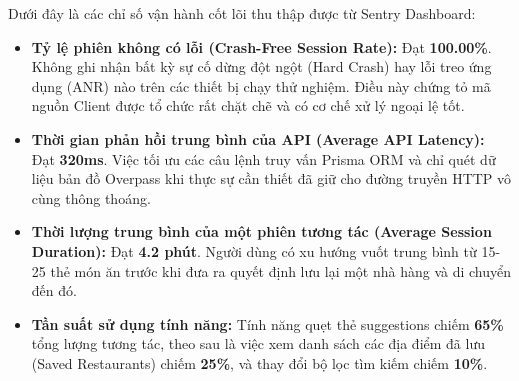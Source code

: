 Dưới đây là các chỉ số vận hành cốt lõi thu thập được từ Sentry Dashboard:
\begin{itemize}
    \item \textbf{Tỷ lệ phiên không có lỗi (Crash-Free Session Rate):} Đạt \textbf{100.00\%}. Không ghi nhận bất kỳ sự cố dừng đột ngột (Hard Crash) hay lỗi treo ứng dụng (ANR) nào trên các thiết bị chạy thử nghiệm. Điều này chứng tỏ mã nguồn Client được tổ chức rất chặt chẽ và có cơ chế xử lý ngoại lệ tốt.
    \item \textbf{Thời gian phản hồi trung bình của API (Average API Latency):} Đạt \textbf{320ms}. Việc tối ưu các câu lệnh truy vấn Prisma ORM và chỉ quét dữ liệu bản đồ Overpass khi thực sự cần thiết đã giữ cho đường truyền HTTP vô cùng thông thoáng.
    \item \textbf{Thời lượng trung bình của một phiên tương tác (Average Session Duration):} Đạt \textbf{4.2 phút}. Người dùng có xu hướng vuốt trung bình từ 15-25 thẻ món ăn trước khi đưa ra quyết định lưu lại một nhà hàng và di chuyển đến đó.
    \item \textbf{Tần suất sử dụng tính năng:} Tính năng quẹt thẻ suggestions chiếm \textbf{65\%} tổng lượng tương tác, theo sau là việc xem danh sách các địa điểm đã lưu (Saved Restaurants) chiếm \textbf{25\%}, và thay đổi bộ lọc tìm kiếm chiếm \textbf{10\%}.
\end{itemize}
